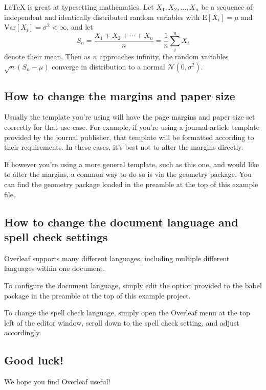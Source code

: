 \documentclass{article}
\begin{document}
\LaTeX{} is great at typesetting mathematics. Let $X_1, X_2, \ldots, X_n$ be a sequence of independent and identically distributed random variables with $\text{E}[X_i] = \mu$ and $\text{Var}[X_i] = \sigma^2 < \infty$, and let
\[S_n = \frac{X_1 + X_2 + \cdots + X_n}{n}
      = \frac{1}{n}\sum_{i}^{n} X_i\]
denote their mean. Then as $n$ approaches infinity, the random variables $\sqrt{n}(S_n - \mu)$ converge in distribution to a normal $\mathcal{N}(0, \sigma^2)$.


\subsection{How to change the margins and paper size}

Usually the template you're using will have the page margins and paper size set correctly for that use-case. For example, if you're using a journal article template provided by the journal publisher, that template will be formatted according to their requirements. In these cases, it's best not to alter the margins directly.

If however you're using a more general template, such as this one, and would like to alter the margins, a common way to do so is via the geometry package. You can find the geometry package loaded in the preamble at the top of this example file.

\subsection{How to change the document language and spell check settings}

Overleaf supports many different languages, including multiple different languages within one document.

To configure the document language, simply edit the option provided to the babel package in the preamble at the top of this example project.

To change the spell check language, simply open the Overleaf menu at the top left of the editor window, scroll down to the spell check setting, and adjust accordingly.

\subsection{Good luck!}

We hope you find Overleaf useful!
\end{document}
